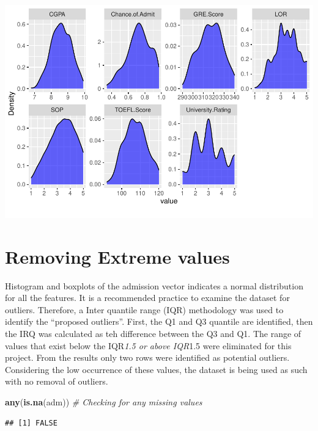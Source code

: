 \documentclass[11pt,]{article}
\newenvironment{Shaded}{\begin{snugshade}}{\end{snugshade}}
\newcommand{\CommentTok}[1]{\textcolor[rgb]{0.56,0.35,0.01}{\textit{#1}}}
\newcommand{\KeywordTok}[1]{\textcolor[rgb]{0.13,0.29,0.53}{\textbf{#1}}}
\newcommand{\NormalTok}[1]{#1}
\begin{document}
\includegraphics{USGradAdmission_files/figure-latex/unnamed-chunk-3-3.pdf}

\hypertarget{removing-extreme-values}{%
\section{Removing Extreme values}\label{removing-extreme-values}}

Histogram and boxplots of the admission vector indicates a normal
distribution for all the features. It is a recommended practice to
examine the dataset for outliers. Therefore, a Inter quantile range
(IQR) methodology was used to identify the ``proposed outliers''. First,
the Q1 and Q3 quantile are identified, then the IRQ was calculated as
teh difference between the Q3 and Q1. The range of values that exist
below the IQR\emph{1.5 or above IQR}1.5 were eliminated for this
project. From the results only two rows were identified as potential
outliers. Considering the low occurrence of these values, the dataset is
being used as such with no removal of outliers.

\begin{Shaded}
\begin{Highlighting}[]
\KeywordTok{any}\NormalTok{(}\KeywordTok{is.na}\NormalTok{(adm)) }\CommentTok{# Checking for any missing values}
\end{Highlighting}
\end{Shaded}

\begin{verbatim}
## [1] FALSE
\end{verbatim}
\end{document}
